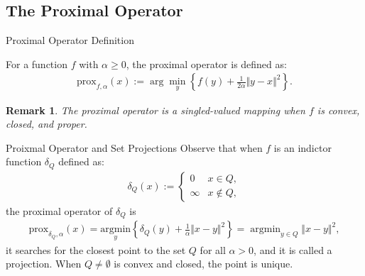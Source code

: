 \documentclass[11pt]{beamer}
\DeclareMathOperator {\argmin}{argmin}
\newtheorem{remark}{Remark}
\begin{document}
    \subsection{The Proximal Operator}
        \begin{frame}{Proximal Operator Definition}
            \begin{definition}
                For a function $f$ with $\alpha \ge 0$, the proximal operator is defined as: 
                \begin{align*}
                    \text{prox}_{f, \alpha}(x) := 
                    \arg\min_{y}\left\lbrace
                        f(y) + \frac{1}{2\alpha} \Vert y - x\Vert^2
                    \right\rbrace. 
                \end{align*}
            \end{definition}  
            \begin{remark}
                The proximal operator is a singled-valued mapping when $f$ is convex, closed, and proper. 
            \end{remark}
        \end{frame}
        \begin{frame}{Proixmal Operator and Set Projections}
            Observe that when $f$ is an indictor function $\delta_Q$ defined as: 
            \begin{align*}
                \delta_Q(x) := 
                \begin{cases}
                    0 & x \in Q,
                    \\
                    \infty  & x \not \in Q, 
                \end{cases}
            \end{align*}
            the proximal operator of $\delta_Q$ is
            \begin{align*}
               \text{prox}_{\delta_Q, \alpha}(x)=\underset{y}{\text{argmin}}
               \left\lbrace
                    \delta_Q(y) + \frac{1}{\alpha}\Vert x - y\Vert^2
               \right\rbrace = \argmin_{y\in Q}\Vert x - y\Vert^2,
            \end{align*}
            it searches for the closest point to the set $Q$ for all $\alpha > 0$, and it is called a projection. When $Q\neq \emptyset$ is convex and closed, the point is unique. 
        \end{frame}
\end{document}
